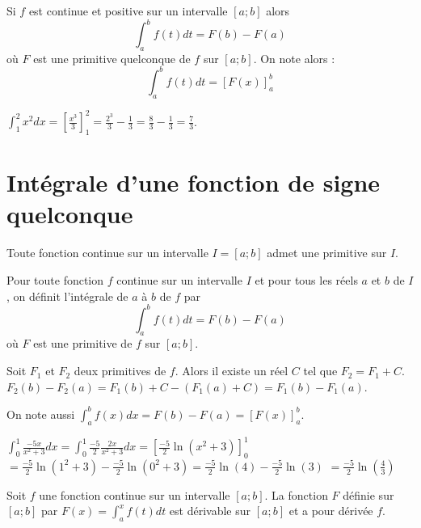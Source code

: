 \documentclass[french]{book}
\begin{document}
\newpage


\begin{prop}
 Si $f$ est continue et positive sur un intervalle $[a;b]$ alors
$$\int_{a}^{b}f(t)dt=F(b)-F(a)$$
où $F$ est une primitive quelconque de $f$ sur $[a;b]$. On note alors :
$$\int_{a}^{b}f(t)dt=[F(x)]_{a}^{b}$$
\end{prop}


\begin{exemple}
$\int_{1}^{2}x^2dx=[\frac{x^3}{3}]_{1}^{2}=\frac{2^3}{3}-\frac{1}{3}=\frac{8}{3}-\frac{1}{3}=\frac{7}{3}$.
\end{exemple}




\section{Intégrale d'une fonction de signe quelconque}


\begin{thm}
Toute fonction continue sur un intervalle $I=[a;b]$ admet une primitive sur $I$.
\end{thm}


\begin{thm}[et définition]
 Pour toute fonction $f$ continue sur un intervalle $I$ et pour tous les réels $a$ et $b$ de $I$, on définit l'intégrale de $a$ à $b$ de $f$ par $$\int_{a}^{b}f(t)dt=F(b)-F(a)$$
 où $F$ est une primitive de $f$ sur $[a;b]$.
\end{thm}

\begin{demo}
Soit $F_1$ et $F_2$ deux primitives de $f$. Alors il existe un réel $C$ tel que $F_2=F_1+C$. $F_2(b)-F_2(a)=F_1(b)+C-(F_1(a)+C)=F_1(b)-F_1(a)$.
\end{demo}


\begin{rem}
On note aussi $\int_{a}^{b}f(x)dx=F(b)-F(a)=[F(x)]_{a}^{b}$.
\end{rem}

\begin{exemple}
$\int_{0}^{1}\frac{-5x}{x^2+3}dx=\int_{0}^{1}\frac{-5}{2}\frac{2x}{x^2+3}dx=[\frac{-5}{2}\ln(x^2+3)]_0^{1}$\\
$=\frac{-5}{2}\ln(1^2+3)-\frac{-5}{2}\ln(0^2+3)=\frac{-5}{2}\ln(4)-\frac{-5}{2}\ln(3)$
$=\frac{-5}{2}\ln(\frac{4}{3})$
\end{exemple}

\newpage


\begin{thm}
 Soit $f$ une fonction continue sur un intervalle $[a;b]$. La fonction $F$ définie sur $[a;b]$ par $F(x)=\int_{a}^{x}f(t)dt$ est dérivable sur $[a;b]$ et a pour dérivée $f$.
\end{thm}
\end{document}
